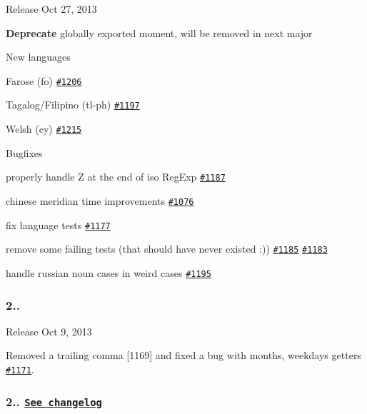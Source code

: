 \begin{DoxyItemize}
\item Release Oct 27, 2013
\item {\bfseries Deprecate} globally exported moment, will be removed in next major
\item New languages
\begin{DoxyItemize}
\item Farose (fo) \href{https://github.com/moment/moment/issues/1206}{\tt \#1206}
\item Tagalog/\+Filipino (tl-\/ph) \href{https://github.com/moment/moment/issues/1197}{\tt \#1197}
\item Welsh (cy) \href{https://github.com/moment/moment/issues/1215}{\tt \#1215}
\end{DoxyItemize}
\item Bugfixes
\begin{DoxyItemize}
\item properly handle Z at the end of iso Reg\+Exp \href{https://github.com/moment/moment/issues/1187}{\tt \#1187}
\item chinese meridian time improvements \href{https://github.com/moment/moment/issues/1076}{\tt \#1076}
\item fix language tests \href{https://github.com/moment/moment/issues/1177}{\tt \#1177}
\item remove some failing tests (that should have never existed \+:)) \href{https://github.com/moment/moment/issues/1185}{\tt \#1185} \href{https://github.com/moment/moment/issues/1183}{\tt \#1183}
\item handle russian noun cases in weird cases \href{https://github.com/moment/moment/issues/1195}{\tt \#1195}
\end{DoxyItemize}
\end{DoxyItemize}

\subsubsection*{2..}


\begin{DoxyItemize}
\item Release Oct 9, 2013
\end{DoxyItemize}

Removed a trailing comma \mbox{[}1169\mbox{]} and fixed a bug with {\ttfamily months}, {\ttfamily weekdays} getters \href{https://github.com/moment/moment/issues/1171}{\tt \#1171}.

\subsubsection*{2.. \href{https://gist.github.com/ichernev/6864354}{\tt See changelog}}


